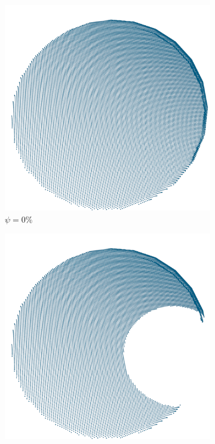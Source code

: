 \begin{figure}[!t]
	\centering
	\hfill
	\begin{subfigure}{0.32\textwidth}
		\centering
		\includegraphics[width=\linewidth]{Figures/ObjRecog/occlusion_0}
		\caption{$\psi=0\%$}
		\label{subfig:objrecog:occlusion:0}
	\end{subfigure}
	\hfill
	\begin{subfigure}{0.32\textwidth}
		\centering
		\includegraphics[width=\linewidth]{Figures/ObjRecog/occlusion_25}

\end{subfigure}
\end{figure}

